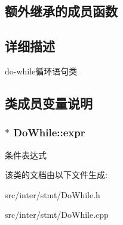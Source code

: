 \subsection*{额外继承的成员函数}


\subsection{详细描述}
do-\/while循环语句类 

\subsection{类成员变量说明}
\subsubsection[{\texorpdfstring{expr}{expr}}]{$\ast$ Do\+While\+::expr}\hypertarget{class_do_while_a55d5ffb9c6bee10f8375f028705e4901}{}\label{class_do_while_a55d5ffb9c6bee10f8375f028705e4901}
条件表达式 

该类的文档由以下文件生成\+:\begin{DoxyCompactItemize}
\item 
src/inter/stmt/Do\+While.\+h\item 
src/inter/stmt/Do\+While.\+cpp\end{DoxyCompactItemize}
